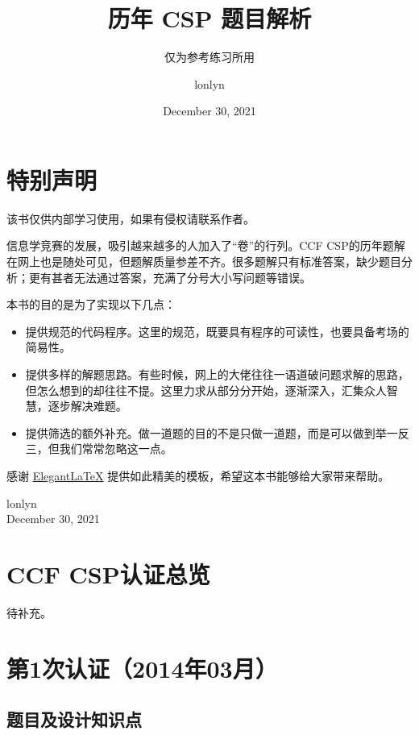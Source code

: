 \documentclass[cn,10pt,math=newtx,citestyle=gb7714-2015,bibstyle=gb7714-2015]{elegantbook}
\title{历年 CSP 题目解析}
\subtitle{仅为参考练习所用}
\author{lonlyn}
\institute{Shanxi University Algorithm Group}
\date{December 30, 2021}
\begin{document}
\maketitle
\frontmatter

\chapter*{特别声明}


该书仅供内部学习使用，如果有侵权请联系作者。

信息学竞赛的发展，吸引越来越多的人加入了“卷”的行列。CCF CSP的历年题解在网上也是随处可见，但题解质量参差不齐。很多题解只有标准答案，缺少题目分析；更有甚者无法通过答案，充满了分号大小写问题等错误。

本书的目的是为了实现以下几点：

\begin{itemize}
  \item 提供规范的代码程序。这里的规范，既要具有程序的可读性，也要具备考场的简易性。
  \item 提供多样的解题思路。有些时候，网上的大佬往往一语道破问题求解的思路，但怎么想到的却往往不提。这里力求从部分分开始，逐渐深入，汇集众人智慧，逐步解决难题。
  \item 提供筛选的额外补充。做一道题的目的不是只做一道题，而是可以做到举一反三，但我们常常忽略这一点。
\end{itemize}

感谢 \href{https://github.com/ElegantLaTeX/ElegantBook}{Elegant\LaTeX{}} 提供如此精美的模板，希望这本书能够给大家带来帮助。

\vskip 1.5cm

\begin{flushright}
lonlyn\\
December 30, 2021
\end{flushright}

\tableofcontents

\mainmatter

\chapter{CCF CSP认证总览}

待补充。

\chapter{第1次认证（2014年03月）}

\section{题目及设计知识点}
\end{document}
